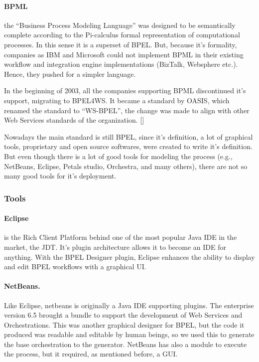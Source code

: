 \paragraph{BPML} 
the ``Business Process Modeling Language'' was designed to be semantically complete according to the Pi-calculus formal representation of computational processes. In this sense it is a superset of BPEL. But, because it's formality, companies as IBM and Microsoft could not implement BPML in their existing workflow and integration engine implementations (BizTalk, Websphere etc.). Hence, they pushed for a simpler language.

In the beginning of 2003, all the companies supporting BPML discontinued it's support, migrating to BPEL4WS. It became a standard by OASIS, which renamed the standard to ``WS-BPEL'', the change was made to align with other Web Services standards of the organization. [\citet{OASIS}]

Nowadays the main standard is still BPEL, since it's definition, a lot of graphical tools, proprietary and open source softwares, were created to write it's definition. But even though there is a lot of good tools for modeling the process (e.g., NetBeans, Eclipse, Petals studio, Orchestra, and many others), there are not so many good tools for it's deployment.

\subsubsection{Tools}

\paragraph{Eclipse}
is the Rich Client Platform behind one of the most popular Java IDE in the market, the JDT. It's plugin architecture allows it to become an IDE for anything. With the BPEL Designer plugin, Eclipse enhances the ability to display and edit BPEL workflows with a graphical UI.

\paragraph{NetBeans.}
Like Eclipse, netbeans is originally a Java IDE supporting plugins. The enterprise version 6.5 brought a bundle to support the development of Web Services and Orchestrations. This was another graphical designer for BPEL, but the code it produced was readable and editable by human beings, so we used this to generate the base orchestration to the generator. NetBeans has also a module to execute the process, but it required, as mentioned before, a GUI.

